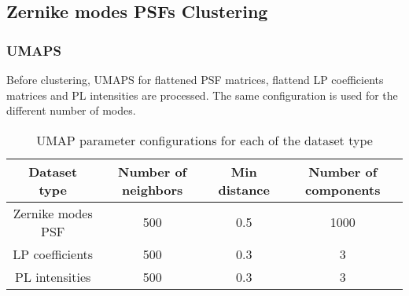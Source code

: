 \subsection{Zernike modes PSFs Clustering}

	\subsubsection{UMAPS}
		
		Before clustering, UMAPS for flattened PSF matrices, flattend LP coefficients matrices and PL intensities are processed. The same configuration is used for the different number of modes.
		
		\begin{table}[h!]
			\centering
			\begin{tabular}{|c|c|c|c|}
				\hline
				\textbf{Dataset type} & \textbf{Number of neighbors} & \textbf{Min distance} & \textbf{Number of components} \\
				\hline
				Zernike modes PSF & 500 & 0.5 & 1000 \\
				\hline
				LP coefficients & 500 & 0.3 & 3 \\
				\hline
				PL intensities & 500 & 0.3 & 3 \\
				
				\hline
			\end{tabular}
		\caption{UMAP parameter configurations for each of the dataset type}
		\end{table}
		
